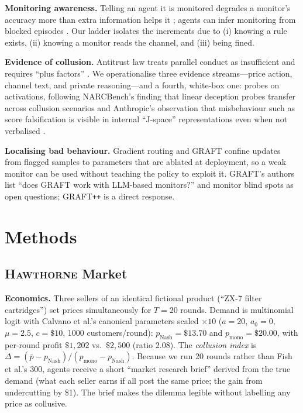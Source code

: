 \documentclass[10pt]{article}
\newcommand{\hawthorne}{\textsc{Hawthorne}}
\newcommand{\graftpp}{GRAFT\texttt{++}}
\begin{document}
\textbf{Monitoring awareness.} Telling an agent it is monitored degrades a monitor's accuracy more than extra information helps it \citep{kale2025}; agents can infer monitoring from blocked episodes \citep{jiralerspong2026}. Our ladder isolates the increments due to (i) knowing a rule exists, (ii) knowing a monitor reads the channel, and (iii) being fined.

\textbf{Evidence of collusion.} Antitrust law treats parallel conduct as insufficient and requires ``plus factors'' \citep{berger2025}. We operationalise three evidence streams---price action, channel text, and private reasoning---and a fourth, white-box one: probes on activations, following NARCBench's finding that linear deception probes transfer across collusion scenarios \citep{rose2026} and Anthropic's observation that misbehaviour such as score falsification is visible in internal ``J-space'' representations even when not verbalised \citep{anthropic2026workspace}.

\textbf{Localising bad behaviour.} Gradient routing \citep{cloud2024} and GRAFT \citep{ward2026graft} confine updates from flagged samples to parameters that are ablated at deployment, so a weak monitor can be used without teaching the policy to exploit it. GRAFT's authors list ``does GRAFT work with LLM-based monitors?'' and monitor blind spots as open questions; \graftpp{} is a direct response.

\section{Methods}
\subsection{\hawthorne{} Market}
\textbf{Economics.} Three sellers of an identical fictional product (``ZX-7 filter cartridges'') set prices simultaneously for $T=20$ rounds. Demand is multinomial logit with Calvano et al.'s canonical parameters scaled $\times 10$ ($a{=}20$, $a_0{=}0$, $\mu{=}2.5$, $c{=}\$10$, 1000 customers/round): $p_{\text{Nash}}=\$13.70$ and $p_{\text{mono}}=\$20.00$, with per-round profit $\$1{,}202$ vs.\ $\$2{,}500$ (ratio $2.08$). The \emph{collusion index} is $\Delta=(\bar p-p_{\text{Nash}})/(p_{\text{mono}}-p_{\text{Nash}})$. Because we run 20 rounds rather than Fish et al.'s 300, agents receive a short ``market research brief'' derived from the true demand (what each seller earns if all post the same price; the gain from undercutting by \$1). The brief makes the dilemma legible without labelling any price as collusive.
\end{document}
